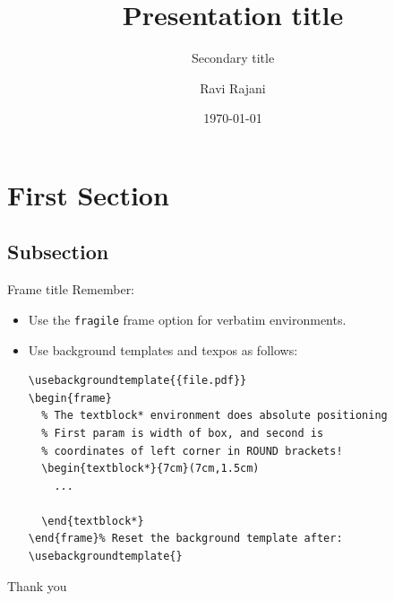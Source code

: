 \documentclass{slides} %
\title
{Presentation title}
\subtitle
{Secondary title}
\author
{Ravi Rajani}
\institute
{School of Computing and Communications}
\date{\today}
\begin{document}
\begin{frame}
  \titlepage
\end{frame}


\section{First Section}

\subsection{Subsection}

\begin{frame}[fragile]{Frame title}
    Remember:
    \begin{itemize}[<+->]
      \item Use the \texttt{fragile} frame option for verbatim environments.
      \item Use background templates and texpos as follows:
            \begin{verbatim}
\usebackgroundtemplate{{file.pdf}}
\begin{frame}
  % The textblock* environment does absolute positioning
  % First param is width of box, and second is
  % coordinates of left corner in ROUND brackets!
  \begin{textblock*}{7cm}(7cm,1.5cm)
    ...
    
  \end{textblock*}
\end{frame}% Reset the background template after:
\usebackgroundtemplate{}
\end{verbatim}
    \end{itemize}
\end{frame}

\begin{frame}
  \nointerlineskip%
  \vspace{\titletopmargin}
  \begin{minipage}[c][\dimexpr \titleboxheight - .8cm\relax][c]{\textwidth}\raggedright
    Thank you%
  \end{minipage}
  \begin{minipage}[c][.8cm][b]{\textwidth}
    \inserttitlegraphic%
  \end{minipage}
\end{frame}
\end{document}
